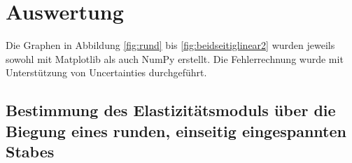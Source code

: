
\section{Auswertung}
\label{sec:Auswertung}
Die Graphen in Abbildung \ref{fig:rund} bis \ref{fig:beidseitiglinear2} wurden jeweils sowohl mit Matplotlib \cite{matplotlib} als auch NumPy \cite{numpy} erstellt. Die Fehlerrechnung wurde mit Unterstützung von Uncertainties \cite{uncertainties} durchgeführt.\newline 

\subsection{Bestimmung des Elastizitätsmoduls über die Biegung eines runden, einseitig eingespannten Stabes}


